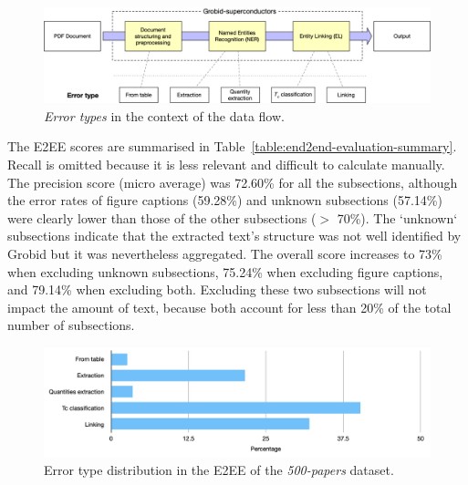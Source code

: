 \begin{figure}[htbp]
    \centering
    \includegraphics[width=\textwidth]{figures/automatic_extraction_supercon/error-types-colors}
    \caption{\textit{Error types} in the context of the data flow. }
    \label{fig:error-types}
\end{figure}

The E2EE scores are summarised in Table~\ref{table:end2end-evaluation-summary}.
Recall is omitted because it is less relevant and difficult to calculate manually.
The precision score (micro average) was 72.60\% for all the subsections, although the error rates of figure captions (59.28\%) and unknown subsections (57.14\%) were clearly lower than those of the other subsections ($>$ 70\%).
The `unknown` subsections indicate that the extracted text's structure was not well identified by Grobid but it was nevertheless aggregated.
The overall score increases to 73\% when excluding unknown subsections, 75.24\% when excluding figure captions, and 79.14\%  when excluding both.
Excluding these two subsections will not impact the amount of text, because both account for less than 20\% of the total number of subsections.

\begin{figure}[htbp]
    \centering
    \includegraphics[width=\linewidth]{figures/automatic_extraction_supercon/error-types-bars-perc}
    \caption{Error type distribution in the E2EE of the \textit{500-papers} dataset.}
    \label{fig:error-types-distribution}
\end{figure}

